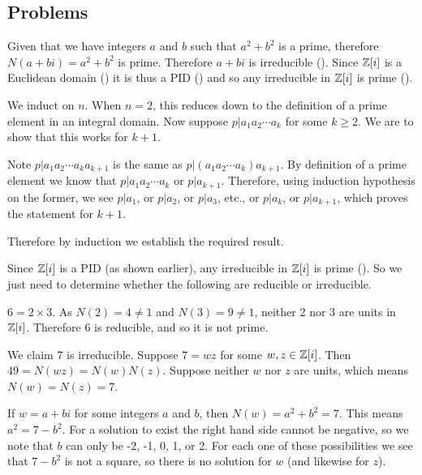 \subsection*{Problems}
\begin{questions}
    \item Given that we have integers $a$ and $b$ such that $a^2 + b^2$ is a prime, therefore $N(a+bi) = a^2+b^2$ is prime. Therefore $a+bi$ is irreducible (). Since $\mathbb{Z}[i]$ is a Euclidean domain () it is thus a PID () and so any irreducible in $\mathbb{Z}[i]$ is prime ().

    \item We induct on $n$. When $n = 2$, this reduces down to the definition of a prime element in an integral domain. Now suppose $p \vert a_1a_2\cdots a_k$ for some $k \geq 2$. We are to show that this works for $k + 1$.

    Note $p \vert a_1a_2\cdots a_ka_{k+1}$ is the same as $p \vert (a_1a_2\cdots a_k)a_{k+1}$. By definition of a prime element we know that $p \vert a_1a_2\cdots a_k$ or $p \vert a_{k+1}$. Therefore, using induction hypothesis on the former, we see $p\vert a_1$, or $p\vert a_2$, or $p \vert a_3$, etc., or $p \vert a_k$, or $p \vert a_{k+1}$, which proves the statement for $k + 1$.

    Therefore by induction we establish the required result.

    \item Since $\mathbb{Z}[i]$ is a PID (as shown earlier), any irreducible in $\mathbb{Z}[i]$ is prime (). So we just need to determine whether the following are reducible or irreducible.
    \begin{partquestions}{\alph*}
        \item $6 = 2 \times 3$. As $N(2) = 4 \neq 1$ and $N(3) = 9 \neq 1$, neither 2 nor 3 are units in $\mathbb{Z}[i]$. Therefore 6 is reducible, and so it is not prime.

        \item We claim 7 is irreducible. Suppose $7 = wz$ for some $w,z \in \mathbb{Z}[i]$. Then $49 = N(wz) = N(w)N(z)$. Suppose neither $w$ nor $z$ are units, which means $N(w) = N(z) = 7$.

        If $w = a+bi$ for some integers $a$ and $b$, then $N(w) = a^2+b^2 = 7$. This means $a^2 = 7 - b^2$. For a solution to exist the right hand side cannot be negative, so we note that $b$ can only be -2, -1, 0, 1, or 2. For each one of these possibilities we see that $7 - b^2$ is not a square, so there is no solution for $w$ (and likewise for $z$).


\end{partquestions}
\end{questions}

